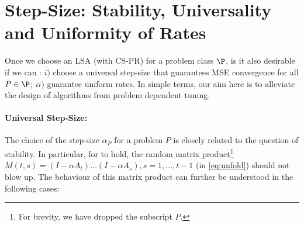 \section{Step-Size: Stability, Universality and Uniformity of Rates}
Once we choose an LSA (with CS-PR) for a problem class $\P$, is it also desirable if we can : $i)$ choose a universal step-size that guarantees MSE convergence for all $P\in\P$; $ii)$ guarantee uniform rates.  In simple terms, our aim here is to alleviate the design of algorithms from problem dependent tuning.
 \paragraph{Universal Step-Size:} The choice of the step-size $\alpha_P$ for a problem $P$ is closely related to the question of stability. In particular, for  to hold,  the random matrix product\footnote{For brevity, we have dropped the subscript $P$.} $M(t,s)=(I-\alpha A_t)\ldots(I-\alpha A_s), s=1,\ldots,t-1$ (in \eqref{eq:unfold}) should not blow up. The behaviour of this matrix product can further be understood in the following cases:
